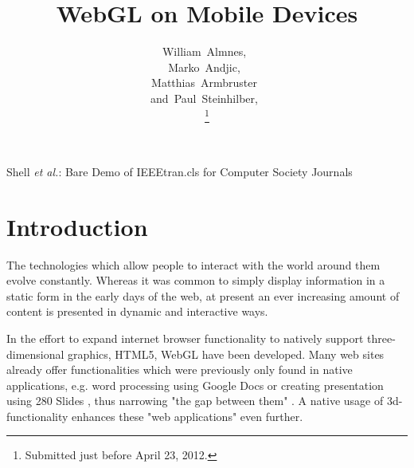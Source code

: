 \documentclass[12pt,journal,compsoc]{IEEEtran}
\begin{document}
\title{WebGL on Mobile Devices}


\author{William~Almnes,~\\
        Marko~Andjic,~\\
        Matthias~Armbruster~\\  
        and~Paul~Steinhilber,~%

\thanks{Submitted just before April 23, 2012.}}


%
{Shell \MakeLowercase{\textit{et al.}}: Bare Demo of IEEEtran.cls for Computer Society Journals}



\maketitle

\IEEEdisplaynotcompsoctitleabstractindextext
\IEEEpeerreviewmaketitle


\section{Introduction}
The technologies which allow people to interact with the world around them evolve constantly. Whereas it was common to simply display information in a static form in the early days of the web, at present an ever increasing amount of content is presented in dynamic and interactive ways.

In the effort to expand internet browser functionality to natively support three-dimensional graphics, HTML5, WebGL have been developed. Many web sites already offer functionalities which were previously only found in native applications, e.g. word processing using Google Docs \cite{googledocs} or creating presentation using 280 Slides \cite{280slides}, thus narrowing "the gap between them" \cite{Golubovic2011}. A native usage of 3d-functionality enhances these "web applications" even further.
\end{document}
